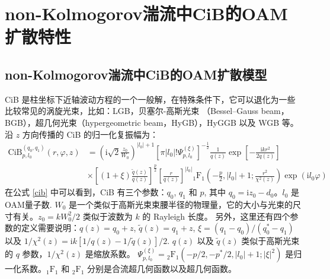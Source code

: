 \documentclass[master]{thesis-uestc}
\begin{document}
\section{non-Kolmogorov湍流中CiB的OAM扩散特性}

\subsection{non-Kolmogorov湍流中CiB的OAM扩散模型}

CiB 是柱坐标下近轴波动方程的一个一般解，在特殊条件下，它可以退化为一些比较常见的涡旋光束，比如：LGB，贝塞尔-高斯光束 （Bessel–Gauss beam，BGB），超几何光束（hypergeometric beam，HyGB），HyGGB 以及 WGB 等。沿 $z$ 方向传播的 CiB 的归一化复振幅为：
\begin{equation}\label{cib}
  \begin{array}{rl}
    \mathrm{CiB}^{(q_0,q_1)}_{p,l_0}(r,\varphi,z)&\displaystyle=\left(\mathrm{i}\sqrt{2}\frac{z_0}{W_0}\right)^{\left|l_0\right|+1}%
    \left[\pi\left|l_0\right|!\Psi^{(\xi)}_{p,l_0}\right]^{-\frac{1}{2}}\frac{1}{q(z)}%
    \exp\left[-\frac{\mathrm{i}kr^2}{2q(z)}\right]\\[0.5cm]%
    &\displaystyle\times\left[(1+\xi)\frac{\widetilde{q}(z)}{q(z)}\right]^\frac{p}{2}%
    \left[\frac{r}{q(z)}\right]^{\left|l_0\right|}{}_1\mathrm{F}_1\left(-\frac{p}{2},\left|l_0\right|+1;\frac{r^2}{\chi^2(z)}\right)\exp(\mathrm{i}l_0\varphi)
  \end{array}
\end{equation}
\noindent 在公式 \eqref{cib} 中可以看到，CiB 有三个参数：$q_0$, $q_1$ 和 $p$, 其中 $q_0=\mathrm{i}z_0-d_0$。$l_0$ 是OAM量子数. $W_0$ 是一个类似于高斯光束束腰半径的物理量，它的大小与光束的尺寸有关。$z_0=kW_0^2/2$ 类似于波数为 $k$ 的 Rayleigh 长度。 另外，这里还有四个参数的定义需要说明：$q(z)=q_0+z$, $\widetilde{q}(z)=q_1+z$,
$\xi=(q_1-q_0)/(q^*_0-q_1)$ 以及 $1/\chi^2(z)=\mathrm{i}k\left[1/q(z)-1/\widetilde{q}(z)\right]/2$. $q(z)$ 以及 $\widetilde{q}(z)$ 类似于高斯光束的 $q$ 参数，$1/\chi^2(z)$ 是缩放系数。 $\Psi^{(\xi)}_{p,l_0}={}_2\mathrm{F}_1\left(-p/2,-p^*/2,\left|l_0\right|+1;\left|\xi\right|^2\right)$ 是归一化系数。${}_1\mathrm{F}_1$ 和 ${}_2\mathrm{F}_1$ 分别是合流超几何函数以及超几何函数。
\end{document}
